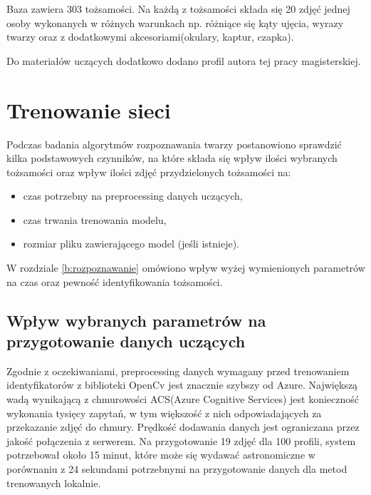 Baza zawiera 303 tożsamości. Na każdą z tożsamości składa się 20 zdjęć jednej osoby wykonanych w różnych warunkach np. różniące się kąty ujęcia, wyrazy twarzy oraz z dodatkowymi akcesoriami(okulary, kaptur, czapka). 

Do materiałów uczących dodatkowo dodano profil autora tej pracy magisterskiej.

\section{Trenowanie sieci}
Podczas badania algorytmów rozpoznawania twarzy postanowiono sprawdzić kilka podstawowych czynników, na które składa się wpływ ilości wybranych tożsamości oraz wpływ ilości zdjęć przydzielonych tożsamości na:
\begin{itemize}
\item czas potrzebny na preprocessing danych uczących,
\item czas trwania trenowania modelu,
\item rozmiar pliku zawierającego model (jeśli istnieje).
\end{itemize}
W rozdziale \ref{b:rozpoznawanie} omówiono wpływ wyżej wymienionych parametrów na czas oraz pewność identyfikowania tożsamości.

\subsection{Wpływ wybranych parametrów na przygotowanie danych uczących}
Zgodnie z oczekiwaniami, preprocessing danych wymagany przed trenowaniem identyfikatorów z biblioteki OpenCv jest znacznie szybszy od Azure. Największą wadą wynikającą z chmurowości  ACS(Azure Cognitive Services) jest konieczność wykonania tysięcy zapytań, w tym większość z nich odpowiadających za przekazanie zdjęć do chmury. Prędkość dodawania danych jest ograniczana przez jakość połączenia z serwerem. Na przygotowanie 19 zdjęć dla 100 profili, system potrzebował około 15 minut, które może się wydawać astronomiczne w porównaniu z 24 sekundami potrzebnymi na przygotowanie danych dla metod trenowanych lokalnie.

